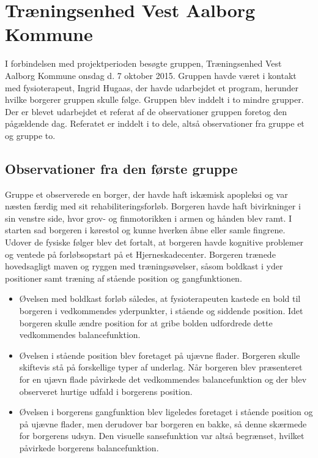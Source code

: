 \chapter{Træningsenhed Vest Aalborg Kommune}
I forbindelsen med projektperioden besøgte gruppen, Træningsenhed Vest Aalborg Kommune onsdag d. 7 oktober 2015. Gruppen havde været i kontakt med fysioterapeut, Ingrid Hugaas, der havde udarbejdet et program, herunder hvilke borgerer gruppen skulle følge. Gruppen blev inddelt i to mindre grupper. Der er blevet udarbejdet et referat af de observationer gruppen foretog den pågældende dag. Referatet er inddelt i to dele, altså observationer fra gruppe et og gruppe to. 

\section{Observationer fra den første gruppe}
Gruppe et observerede en borger, der havde haft iskæmisk apopleksi og var næsten færdig med sit rehabiliteringsforløb. Borgeren havde haft bivirkninger i sin venstre side, hvor grov- og finmotorikken i armen og hånden blev ramt. I starten sad borgeren i kørestol og kunne hverken åbne eller samle fingrene. Udover de fysiske følger blev det fortalt, at borgeren havde kognitive problemer og ventede på forløbsopstart på et Hjerneskadecenter. Borgeren trænede hovedsagligt maven og ryggen med træningsøvelser, såsom boldkast i yder positioner samt træning af  stående position og gangfunktionen. 
\begin{itemize}
\item Øvelsen med boldkast forløb således, at fysioterapeuten kastede en bold til borgeren i vedkommendes yderpunkter, i stående og siddende position. Idet borgeren skulle ændre position for at gribe bolden udfordrede dette vedkommendes balancefunktion. 
\item Øvelsen i stående position blev foretaget på ujævne flader. Borgeren skulle skiftevis stå på forskellige typer af underlag. Når borgeren blev præsenteret for en ujævn flade påvirkede det vedkommendes balancefunktion og der blev observeret hurtige udfald i borgerens position. 
\item Øvelsen i borgerens gangfunktion blev ligeledes foretaget i stående position og på ujævne flader, men derudover bar borgeren en bakke, så denne skærmede for borgerens udsyn. Den visuelle sansefunktion var altså begrænset, hvilket påvirkede borgerens balancefunktion. 
\end{itemize}

